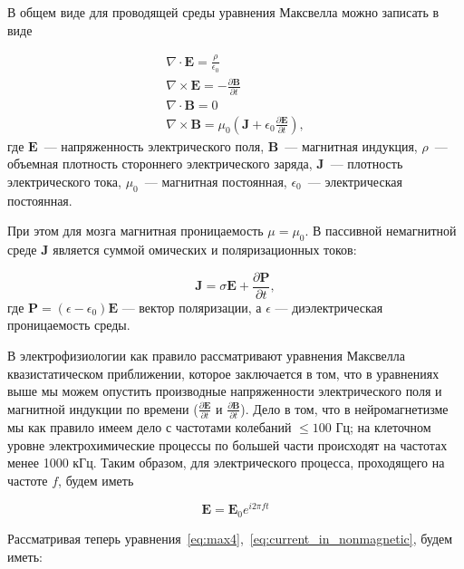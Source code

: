 В общем виде для проводящей среды уравнения Максвелла можно записать в виде

\begin{gather}
    \nabla \cdot \mathbf{E}  = \frac{\rho}{\epsilon_0} \label{eq:max1} \\
    \nabla \times \mathbf{E} = {-\frac{\partial \mathbf{B}}{\partial t}} \label{eq:max2} \\
    \nabla \cdot \mathbf{B}  = 0 \label{eq:max3} \\
    \nabla \times \mathbf{B} = \mu_0 (\mathbf{J} + \epsilon_0 \frac{\partial \mathbf{E}}{\partial t})
    \label{eq:max4},
\end{gather}
где $\mathbf{E}$~--- напряженность электрического поля, $\mathbf{B}$~--- магнитная индукция,
$\rho$~--- объемная плотность стороннего электрического заряда,
$\mathbf{J}$~--- плотность электрического тока,
$\mu_0$~--- магнитная постоянная,
$\epsilon_0$~--- электрическая постоянная.



При этом для мозга магнитная проницаемость $\mu = \mu_0$.  В пассивной немагнитной среде
$\mathbf{J}$ является суммой омических и поляризационных токов:

\begin{equation}
    \mathbf{J} = \sigma \mathbf{E} + \frac{\partial \mathbf{P}}{\partial t},
    \label{eq:current_in_nonmagnetic}
\end{equation}
где $\mathbf{P} = (\epsilon - \epsilon_0) \mathbf{E}$ --- вектор поляризации,
а $\epsilon$ --- диэлектрическая проницаемость среды.

В электрофизиологии как правило рассматривают уравнения  Максвелла квазистатическом
приближении, которое заключается в том, что в уравнениях выше мы можем опустить
производные напряженности электрического поля и магнитной индукции по времени
($\frac{\partial \mathbf{E}}{\partial t}$ и $\frac{\partial
\mathbf{B}}{\partial t}$).  Дело в том, что в нейромагнетизме мы как правило
имеем дело с частотами колебаний $\leq 100$ Гц; на клеточном уровне
электрохимические процессы по большей части происходят на частотах менее 1000
кГц.  Таким образом, для электрического процесса, проходящего на частоте $f$,
будем иметь

\begin{equation}
    \mathbf{E} = \mathbf{E}_0 e^{i2\pi ft}
\end{equation}

Рассматривая теперь уравнения~\ref{eq:max4},~\ref{eq:current_in_nonmagnetic}, будем иметь:

